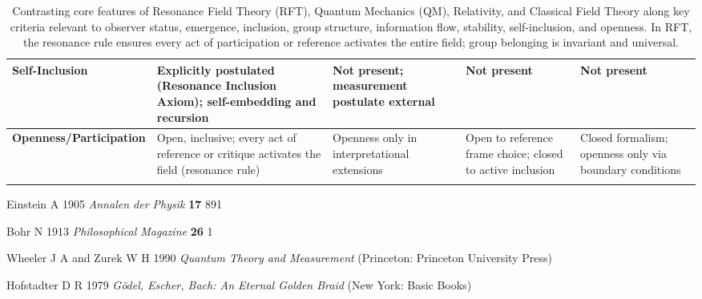 \documentclass[12pt]{article}
\begin{document}
\begin{center}
\begin{longtable}{|p{4cm}|p{3cm}|p{3cm}|p{3cm}|p{3cm}|}
			\hline
			\textbf{Self-Inclusion} & Explicitly postulated (Resonance Inclusion Axiom); self-embedding and recursion & Not present; measurement postulate external & Not present & Not present \\
			\hline
			\textbf{Openness/Participation} & Open, inclusive; every act of reference or critique activates the field (resonance rule) & Openness only in interpretational extensions & Open to reference frame choice; closed to active inclusion & Closed formalism; openness only via boundary conditions \\
			\hline
			
			\caption{Contrasting core features of Resonance Field Theory (RFT), Quantum Mechanics (QM), Relativity, and Classical Field Theory along key criteria relevant to observer status, emergence, inclusion, group structure, information flow, stability, self-inclusion, and openness. In RFT, the resonance rule ensures every act of participation or reference activates the entire field; group belonging is invariant and universal.}
			\label{tab:rft_comparison}
		\end{longtable}
	\end{center}

	
	\begin{thebibliography}{99}
		
		Einstein A 1905 \textit{Annalen der Physik} \textbf{17} 891
		
		Bohr N 1913 \textit{Philosophical Magazine} \textbf{26} 1
		
		Wheeler J A and Zurek W H 1990 \textit{Quantum Theory and Measurement} (Princeton: Princeton University Press)
		
		Hofstadter D R 1979 \textit{G\"odel, Escher, Bach: An Eternal Golden Braid} (New York: Basic Books)
		
		
	\end{thebibliography}

	
\end{document}
